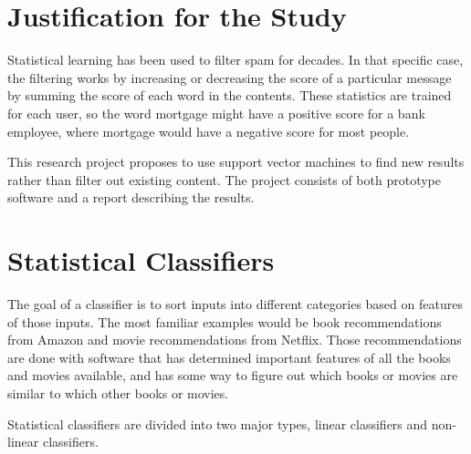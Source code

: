 \documentclass[12pt]{article}
\begin{document}
\section{Justification for the Study}
Statistical learning has been used to filter spam for decades. In that specific case, the filtering works by
increasing or decreasing the score of a particular message by summing the score of each word in the contents.
These statistics are trained for each user, so the word mortgage might have a positive score for a bank
employee, where mortgage would have a negative score for most people.

This research project proposes to use support vector machines to find new results rather than filter out
existing content. The project consists of both prototype software and a report describing the results.

\section{Statistical Classifiers}

The goal of a classifier is to sort inputs into different categories based on features of those inputs. The
most familiar examples would be book recommendations from Amazon and movie recommendations from Netflix. Those
recommendations are done with software that has determined important features of all the books and movies
available, and has some way to figure out which books or movies are similar to which other books or
movies. \cite{michie1994machine}

Statistical classifiers are divided into two major types, linear classifiers and non-linear classifiers.
\end{document}
